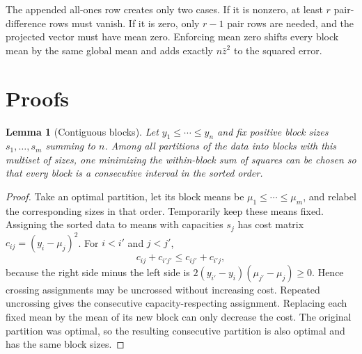 \documentclass[11pt]{article}
\newtheorem{lemma}{Lemma}
\begin{document}
The appended all-ones row creates only two cases. If it is nonzero, at least
$r$ pair-difference rows must vanish. If it is zero, only $r-1$ pair rows are
needed, and the projected vector must have mean zero. Enforcing mean zero
shifts every block mean by the same global mean and adds exactly
$n\bar z^2$ to the squared error.

\section{Proofs}

\begin{lemma}[Contiguous blocks]\label{lem:contiguous}
Let $y_1\le\cdots\le y_n$ and fix positive block sizes
$s_1,\ldots,s_m$ summing to $n$. Among all partitions of the data into
blocks with this multiset of sizes, one minimizing the within-block sum of
squares can be chosen so that every block is a consecutive interval in the
sorted order.
\end{lemma}

\begin{proof}
Take an optimal partition, let its block means be
$\mu_1\le\cdots\le\mu_m$, and relabel the corresponding sizes in that
order. Temporarily keep these means fixed. Assigning the sorted data to means
with capacities $s_j$ has cost matrix
$c_{ij}=(y_i-\mu_j)^2$. For $i<i'$ and $j<j'$,
\[
 c_{ij}+c_{i'j'}\le c_{ij'}+c_{i'j},
\]
because the right side minus the left side is
$2(y_{i'}-y_i)(\mu_{j'}-\mu_j)\ge0$. Hence crossing assignments may be
uncrossed without increasing cost. Repeated uncrossing gives the consecutive
capacity-respecting assignment. Replacing each fixed mean by the mean of its
new block can only decrease the cost. The original partition was optimal, so
the resulting consecutive partition is also optimal and has the same block
sizes.
\end{proof}
\end{document}
